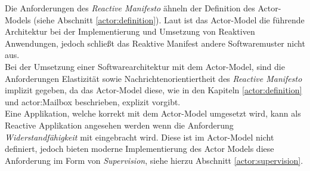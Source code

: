 Die Anforderungen des \textit{Reactive Manifesto} ähneln der Definition des Actor-Models (siehe Abschnitt \ref{actor:definition}). Laut \cite{Vernon2015ReactiveAkka} ist das Actor-Model die führende Architektur bei der Implementierung und Umsetzung von Reaktiven Anwendungen, jedoch schließt das Reaktive Manifest andere Softwaremuster nicht aus. \\
Bei der Umsetzung einer Softwarearchitektur mit dem Actor-Model, sind die Anforderungen Elastizität sowie Nachrichtenorientiertheit des \textit{Reactive Manifesto} implizit gegeben, da das Actor-Model diese, wie in den Kapiteln \ref{actor:definition} und  {actor:Mailbox} beschrieben, explizit vorgibt.\\Eine Applikation, welche korrekt mit dem Actor-Model umgesetzt wird, kann als Reactive Applikation angesehen werden wenn die Anforderung \textit{Widerstandfähigkeit} mit eingebracht wird. Diese ist im Actor-Model nicht definiert, jedoch bieten moderne Implementierung des Actor Models diese Anforderung im Form von \textit{Supervision}, siehe hierzu Abschnitt \ref{actor:supervision}.

